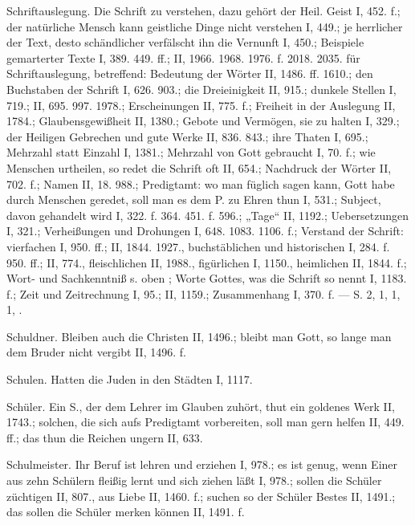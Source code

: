 Schriftauslegung. Die Schrift zu verstehen, dazu gehört der Heil. Geist I, 452. f.; der natürliche Mensch kann geistliche Dinge nicht verstehen I, 449.; je herrlicher der Text, desto schändlicher verfälscht ihn die Vernunft I,
450.; Beispiele gemarterter Texte I, 389. 449. ff.; II, 1966. 1968. 1976. f. 2018. 2035.  für Schriftauslegung, betreffend: Bedeutung der Wörter II, 1486. ff. 1610.; den Buchstaben der Schrift I, 626. 903.; die Dreieinigkeit II, 915.; dunkele Stellen I, 719.; II, 695. 997. 1978.; Erscheinungen II, 775. f.; Freiheit in der Auslegung II, 1784.; Glaubensgewißheit II, 1380.; Gebote und Vermögen, sie zu halten I, 329.; der Heiligen Gebrechen und gute Werke II, 836. 843.; ihre Thaten I, 695.; Mehrzahl statt Einzahl I, 1381.; Mehrzahl von Gott gebraucht I, 70. f.; wie Menschen urtheilen, so redet die Schrift oft II, 654.; Nachdruck der Wörter II, 702. f.; Namen II, 18. 988.; Predigtamt: wo man füglich sagen kann, Gott habe durch Menschen geredet, soll man es dem P. zu Ehren thun I, 531.; Subject, davon gehandelt wird I, 322. f. 364. 451. f. 596.; „Tage“ II, 1192.; Uebersetzungen I, 321.; Verheißungen und Drohungen I, 648. 1083. 1106. f.; Verstand der Schrift: vierfachen I, 950. ff.; II, 1844. 1927., buchstäblichen und historischen I, 284. f. 950. ff.; II, 774., fleischlichen II, 1988., figürlichen I, 1150., heimlichen II, 1844. f.; Wort- und Sachkenntniß s. oben ; Worte Gottes, was die Schrift so nennt I, 1183. f.; Zeit und Zeitrechnung I, 95.; II, 1159.; Zusammenhang I, 370. f. — S.  2,  1,  1,  1, .

Schuldner. Bleiben auch die Christen II, 1496.; bleibt man Gott, so lange man dem Bruder nicht vergibt II, 1496. f.

Schulen. Hatten die Juden in den Städten I, 1117.

Schüler. Ein S., der dem Lehrer im Glauben zuhört, thut ein goldenes Werk II, 1743.; solchen, die sich aufs Predigtamt vorbereiten, soll man gern helfen II, 449. ff.; das thun die Reichen ungern II, 633.

Schulmeister. Ihr Beruf ist lehren und erziehen I, 978.; es ist genug, wenn Einer aus zehn Schülern fleißig lernt und sich ziehen läßt I, 978.; sollen die Schüler züchtigen II, 807., aus Liebe II, 1460. f.; suchen so der Schüler Bestes II, 1491.; das sollen die Schüler merken können II, 1491. f.

